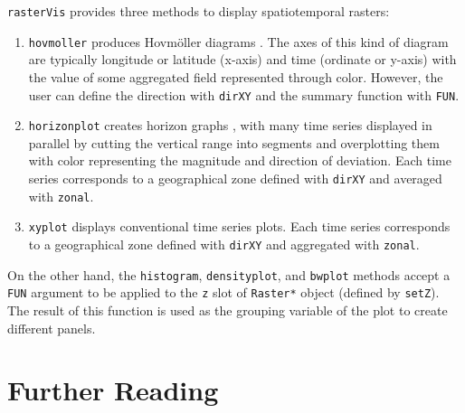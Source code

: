 \documentclass[smallroyalvopaper]{memoir}
\begin{document}
\texttt{rasterVis} \cite{Perpinan.Hijmans2013} provides three methods to display spatiotemporal rasters:

\begin{enumerate}
\item \texttt{hovmoller} produces Hovmöller diagrams \cite{Hovmoeller1949a}. The axes of this kind of diagram are typically longitude or latitude (x-axis) and time (ordinate or y-axis) with the value of some aggregated field represented through color. However, the user can define the direction with \texttt{dirXY} and the summary function with \texttt{FUN}.

\item \texttt{horizonplot} creates horizon graphs \cite{Few2008}, with many time series displayed in parallel by cutting the vertical range into segments and overplotting them with color representing the magnitude and direction of deviation. Each time series corresponds to a geographical zone defined with \texttt{dirXY} and averaged with \texttt{zonal}.

\item \texttt{xyplot} displays conventional time series plots. Each time series corresponds to a geographical zone defined with \texttt{dirXY} and aggregated with \texttt{zonal}.
\end{enumerate}

On the other hand, the \texttt{histogram}, \texttt{densityplot}, and \texttt{bwplot} methods accept a \texttt{FUN} argument to be applied to the \texttt{z} slot of \texttt{Raster*} object (defined by \texttt{setZ}). The result of this function is used as the grouping variable of the plot to create different panels.

\section{Further Reading}
\label{sec:org2d9b6a0}
\label{cha:further-reading-spatiotime}
\end{document}
